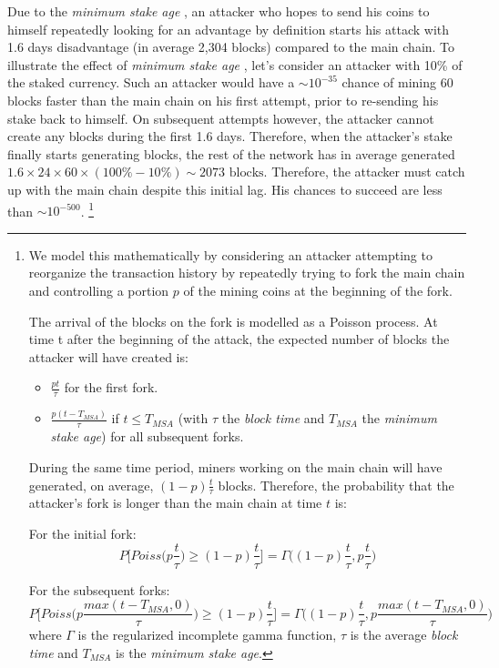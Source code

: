 \documentclass[a4paper,11pt]{article}
\begin{document}
Due to the \textit{minimum stake age} , an attacker who hopes to send his coins to himself repeatedly looking for an advantage by definition starts his attack with 1.6 days disadvantage (in average 2,304 blocks) compared to the main chain. 
To illustrate the effect of \textit{minimum stake age} , let’s consider an attacker with 10\% of the staked currency. Such an attacker would have a $\sim10^{-35}$ chance of mining 60 blocks faster than the main chain on his first attempt, prior to re-sending his stake back to himself. 
On subsequent attempts however, the attacker cannot create any blocks during the first 1.6 days. Therefore, when the attacker's stake finally starts generating blocks, the rest of the network has in average generated $ 1.6 \times 24 \times 60 \times (100\%-10\%)\sim 2073 \text{ blocks} $. Therefore, the attacker must catch up with the main chain despite this initial lag. His chances to succeed are less than $\sim10^{-500}$. \footnote{
	We model this mathematically by considering an attacker attempting to reorganize the transaction history by repeatedly trying to fork the main chain and controlling a portion $p$ of the mining coins at the beginning of the fork.

	The arrival of the blocks on the fork is modelled as a Poisson process. At time t after the beginning of the attack, the expected number of blocks the attacker will have created is:
	\begin{itemize}
	\item{$\frac{p t}{\tau}$ for the first fork.}
	\item{$\frac{p (t-T_{MSA})}{\tau}$ if $t\leq T_{MSA}$ (with $\tau$ the \textit{block time} and $T_{MSA}$ the \textit{minimum stake age}) for all subsequent forks.}
	\end{itemize}

	During the same time period, miners working on the main chain will have generated, on average, $(1-p)\frac{t}{\tau}$ blocks. Therefore, the probability that the attacker's fork is longer than the main chain at time $t$ is:

	For the initial fork: $$P\Big[ Poiss\big(p\frac{t}{\tau}\big)\geq (1-p) \frac{t}{\tau} \Big]=\Gamma\Big((1-p) \frac{t}{\tau},p\frac{t}{\tau} \Big)$$

	For the subsequent forks: $$P\Big[ Poiss\big(p\frac{max(t-T_{MSA},0)}{\tau}\big)\geq (1-p) \frac{t}{\tau} \Big]=\Gamma\Big((1-p) \frac{t}{\tau},p\frac{max(t-T_{MSA},0)}{\tau} \Big)$$
	where $\Gamma$ is the regularized incomplete gamma function, $\tau$ is the average \textit{block time} and $T_{MSA}$ is the \textit{minimum stake age}.

}
\end{document}
